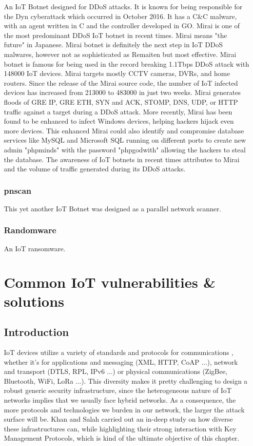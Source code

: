 An IoT Botnet designed for DDoS attacks. It is known for being responsible for the Dyn cyberattack which occurred in October 2016. It has a C\&C malware, with an agent written in C and the controller developed in GO. Mirai is one of the most predominant DDoS IoT botnet in recent times. Mirai means "the future" in Japanese. Mirai botnet is definitely the next step in IoT DDoS malwares, however not as sophisticated as Remaiten but most effective. Mirai botnet is famous for being used in the record breaking 1.1Tbps DDoS attack with 148000 IoT devices. Mirai targets mostly CCTV cameras, DVRs, and home routers. Since the release of the Mirai source code, the number of IoT infected devices has increased from 213000 to 483000 in just two weeks. Mirai generates floods of GRE IP, GRE ETH, SYN and ACK, STOMP, DNS, UDP, or HTTP traffic against a target during a DDoS attack. More recently, Mirai has been found to be enhanced to infect Windows devices, helping hackers hijack even more devices. This enhanced Mirai could also identify and compromise database services like MySQL and Microsoft SQL running on different ports to create new admin "phpminds" with the password "phpgodwith" allowing the hackers to steal the database. The awareness of IoT botnets in recent times attributes to Mirai and the volume of traffic generated during its DDoS attacks.

\subsubsection{pnscan}

This yet another IoT Botnet was designed as a parallel network scanner.

\subsubsection{Randomware}

An IoT ransomware.

\section{Common IoT vulnerabilities \& solutions}

\subsection{Introduction}

IoT devices utilize a variety of standards and protocols for communications \cite{khan_iot_2018}, whether it’s for applications and messaging (XML, HTTP, CoAP ...), network and transport (DTLS, RPL, IPv6 ...) or physical communications (ZigBee, Bluetooth, WiFi, LoRa ...). This diversity makes it pretty challenging to design a robust generic security infrastructure, since the heterogeneous nature of IoT networks implies that we usually face hybrid networks. As a consequence, the more protocols and technologies we burden in our network, the larger the attack surface will be. Khan and Salah \cite{khan_iot_2018} carried out an in-deep study on how diverse these infrastructures can, while highlighting their strong interaction with Key Management Protocols, which is kind of the ultimate objective of this chapter.

